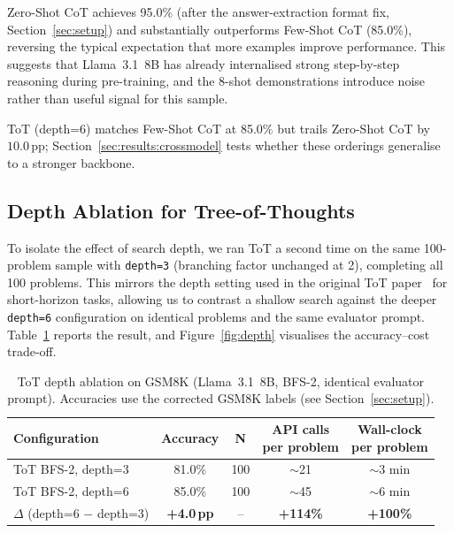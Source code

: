 ﻿\documentclass[runningheads]{llncs}
\begin{document}
Zero-Shot CoT achieves 95.0\% (after the answer-extraction
format fix, Section~\ref{sec:setup}) and substantially
outperforms Few-Shot CoT (85.0\%), reversing the typical
expectation that more examples improve performance.
This suggests that Llama~3.1~8B has already internalised strong
step-by-step reasoning during pre-training, and the 8-shot
demonstrations introduce noise rather than useful signal for this
sample.

ToT (depth=6) matches Few-Shot CoT at 85.0\% but trails Zero-Shot CoT
by $10.0$\,pp; Section~\ref{sec:results:crossmodel} tests whether these
orderings generalise to a stronger backbone.

\subsection{Depth Ablation for Tree-of-Thoughts}
\label{sec:results:depth}

To isolate the effect of search depth, we ran ToT a second time on
the same 100-problem sample with \texttt{depth=3} (branching factor
unchanged at 2), completing all 100 problems.
This mirrors the depth setting used in the original
ToT paper~\cite{yao2023tot} for short-horizon tasks, allowing us to
contrast a shallow search against the deeper \texttt{depth=6}
configuration on identical problems and the same evaluator prompt.
Table~\ref{tab:depth} reports the result, and
Figure~\ref{fig:depth} visualises the accuracy--cost trade-off.

\begin{table}[H]
\centering
\caption{ToT depth ablation on GSM8K (Llama~3.1~8B, BFS-2,
identical evaluator prompt). Accuracies use the corrected GSM8K labels
(see Section~\ref{sec:setup}).}
\label{tab:depth}
\begin{tabular}{@{}lcccc@{}}
\toprule
\textbf{Configuration} & \textbf{Accuracy} & \textbf{N} &
\makecell{\textbf{API calls}\\\textbf{per problem}} &
\makecell{\textbf{Wall-clock}\\\textbf{per problem}} \\
\midrule
ToT BFS-2, depth=3 & 81.0\% & 100 & $\sim$21 & $\sim$3 min \\
ToT BFS-2, depth=6 & 85.0\% & 100 & $\sim$45 & $\sim$6 min \\
\midrule
$\Delta$ (depth=6 $-$ depth=3) & \textbf{+4.0\,pp} & -- &
\textbf{+114\%} & \textbf{+100\%} \\
\bottomrule
\end{tabular}
\end{table}
\end{document}

